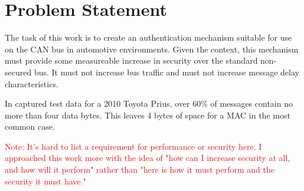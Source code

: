 \section{Problem Statement}

The task of this work is to create an authentication mechanism suitable for use on the CAN bus in automotive environments. Given the context, this mechanism must provide some measureable increase in security over the standard non-secured bus. It must not increase bus traffic and must not increase message delay characteristics.

In captured test data for a 2010 Toyota Prius, over 60\% of messages contain no more than four data bytes. This leaves 4 bytes of space for a MAC in the most common case. 

\textcolor{red}{Note: It's hard to list a requirement for performance or security here. I approached this work more with the idea of "how can I increase security at all, and how will it perform" rather than "here is how it must perform and the security it must have."}
